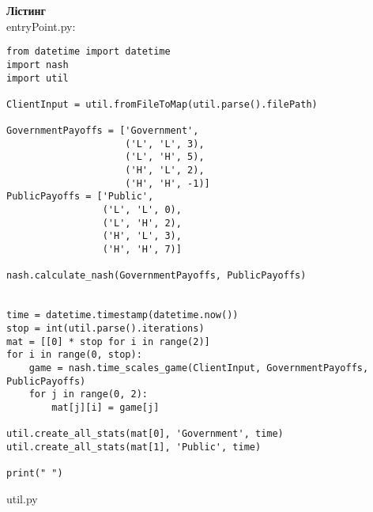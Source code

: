 \textbf{Лістинг}\\
 entryPoint.py:
  \begin{lstlisting}[style=fsharpstyle]
 from datetime import datetime
import nash
import util

ClientInput = util.fromFileToMap(util.parse().filePath)

GovernmentPayoffs = ['Government',
                     ('L', 'L', 3),
                     ('L', 'H', 5),
                     ('H', 'L', 2),
                     ('H', 'H', -1)]
PublicPayoffs = ['Public',
                 ('L', 'L', 0),
                 ('L', 'H', 2),
                 ('H', 'L', 3),
                 ('H', 'H', 7)]

nash.calculate_nash(GovernmentPayoffs, PublicPayoffs)


time = datetime.timestamp(datetime.now())
stop = int(util.parse().iterations)
mat = [[0] * stop for i in range(2)]
for i in range(0, stop):
    game = nash.time_scales_game(ClientInput, GovernmentPayoffs, PublicPayoffs)
    for j in range(0, 2):
        mat[j][i] = game[j]

util.create_all_stats(mat[0], 'Government', time)
util.create_all_stats(mat[1], 'Public', time)

print(" ")

  \end{lstlisting}
  util.py
